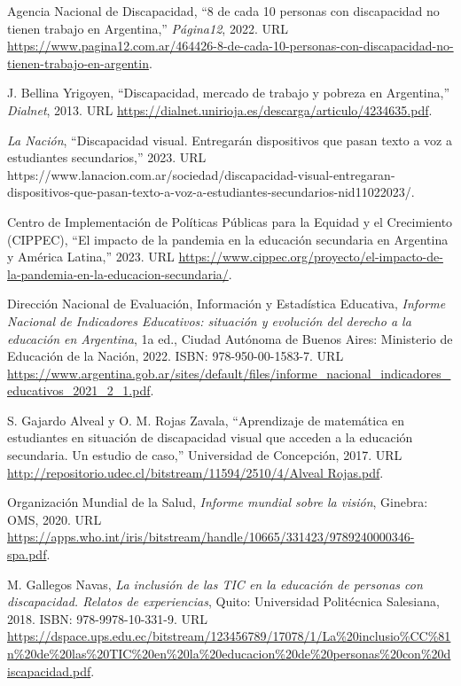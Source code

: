 \documentclass{article}
\begin{document}
\begin{enumerate}[noitemsep, topsep=0pt, parsep=0pt, partopsep=0pt]
	{\changefontsizes{8.9pt}
		\setlength{\itemsep}{0pt}
		\item Agencia Nacional de Discapacidad, ``8 de cada 10 personas con discapacidad no tienen trabajo en Argentina,'' \emph{Página12}, 2022. URL  \url{https://www.pagina12.com.ar/464426-8-de-cada-10-personas-con-discapacidad-no-tienen-trabajo-en-argentin}.
		\item J. Bellina Yrigoyen, ``Discapacidad, mercado de trabajo y pobreza en Argentina,'' \emph{Dialnet}, 2013. URL  \url{https://dialnet.unirioja.es/descarga/articulo/4234635.pdf}.
		\item \emph{La Nación}, ``Discapacidad visual. Entregarán dispositivos que pasan texto a voz a estudiantes secundarios,'' 2023. URL  https://www.lanacion.com.ar/sociedad/discapacidad-visual-entregaran-dispositivos-que-pasan-texto-a-voz-a-estudiantes-secundarios-nid11022023/.
		\item Centro de Implementación de Políticas Públicas para la Equidad y el Crecimiento (CIPPEC), ``El impacto de la pandemia en la educación secundaria en Argentina y América Latina,'' 2023. URL  \url{https://www.cippec.org/proyecto/el-impacto-de-la-pandemia-en-la-educacion-secundaria/}.
		\item Dirección Nacional de Evaluación, Información y Estadística Educativa, \emph{Informe Nacional de Indicadores Educativos: situación y evolución del derecho a la educación en Argentina}, 1a ed., Ciudad Autónoma de Buenos Aires: Ministerio de Educación de la Nación, 2022. ISBN: 978-950-00-1583-7. URL  \url{https://www.argentina.gob.ar/sites/default/files/informe_nacional_indicadores_educativos_2021_2_1.pdf}.
		\item S. Gajardo Alveal y O. M. Rojas Zavala, ``Aprendizaje de matemática en estudiantes en situación de discapacidad visual que acceden a la educación secundaria. Un estudio de caso,'' Universidad de Concepción, 2017. URL  \url{http://repositorio.udec.cl/bitstream/11594/2510/4/Alveal Rojas.pdf}.
		\item Organización Mundial de la Salud, \emph{Informe mundial sobre la visión}, Ginebra: OMS, 2020. URL  \url{https://apps.who.int/iris/bitstream/handle/10665/331423/9789240000346-spa.pdf}.
		\item M. Gallegos Navas, \emph{La inclusión de las TIC en la educación de personas con discapacidad. Relatos de experiencias}, Quito: Universidad Politécnica Salesiana, 2018. ISBN: 978-9978-10-331-9. URL  \url{https://dspace.ups.edu.ec/bitstream/123456789/17078/1/La%20inclusio%CC%81n%20de%20las%20TIC%20en%20la%20educacion%20de%20personas%20con%20discapacidad.pdf}.
}
\end{enumerate}
\end{document}
